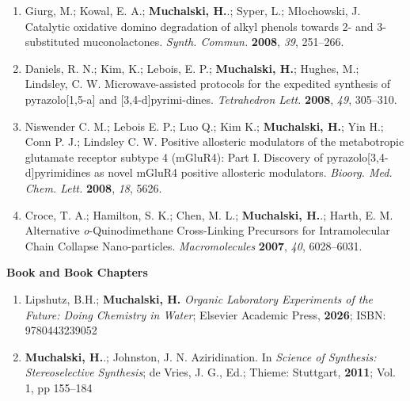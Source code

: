\documentclass[11pt,letterpaper]{article}
\begin{document}
\begin{enumerate}[itemindent=0pt]
  \item Giurg, M.; Kowal, E. A.; \textbf{Muchalski, H.}.; Syper, L.; Młochowski, J. Catalytic oxidative domino degradation of alkyl phenols towards 2- and 3-substituted muconolactones. \textit{Synth. Commun.} \textbf{2008}, \textit{39}, 251--266.

  \item Daniels, R. N.; Kim, K.; Lebois, E. P.; \textbf{Muchalski, H.}; Hughes, M.; Lindsley, C. W. Microwave-assisted protocols for the expedited synthesis of pyrazolo[1,5-a] and [3,4-d]pyrimi-dines. \textit{Tetrahedron Lett.} \textbf{2008}, \textit{49}, 305--310.

  \item Niswender C. M.; Lebois E. P.; Luo Q.; Kim K.; \textbf{Muchalski, H.}; Yin H.; Conn P. J.; Lindsley C. W. Positive allosteric modulators of the metabotropic glutamate receptor subtype 4 (mGluR4): Part I. Discovery of pyrazolo[3,4-d]pyrimidines as novel mGluR4 positive allosteric modulators. \textit{Bioorg. Med. Chem. Lett.} \textbf{2008}, \textit{18}, 5626.

  \item Croce, T. A.; Hamilton, S. K.; Chen, M. L.; \textbf{Muchalski, H.}.; Harth, E. M. Alternative \textit{o}-Quinodimethane Cross-Linking Precursors for Intramolecular Chain Collapse Nano-particles. \textit{Macromolecules} \textbf{2007}, \textit{40}, 6028--6031.

\end{enumerate}

\bigskip
\textbf{Book and Book Chapters} \newline
\begin{enumerate}[itemindent=0pt]
  \item Lipshutz, B.H.; \textbf{Muchalski, H.} \textit{Organic Laboratory Experiments of the Future: Doing Chemistry in Water}; Elsevier Academic Press, \textbf{2026}; ISBN: 9780443239052
  
  \item \textbf{Muchalski, H.}.; Johnston, J. N. Aziridination. In \textit{Science of Synthesis: Stereoselective Synthesis}; de Vries, J. G., Ed.; Thieme: Stuttgart, \textbf{2011}; Vol. 1, pp 155--184 
\end{enumerate}

\end{document}
